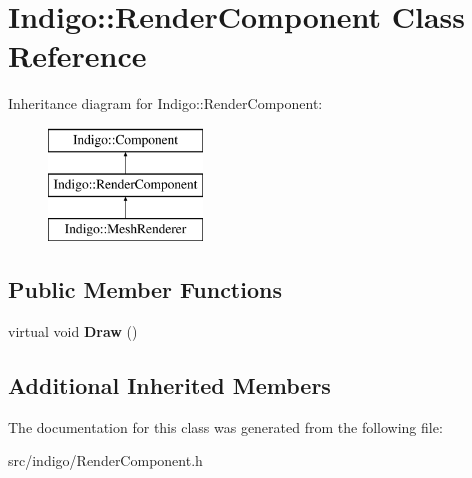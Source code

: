 \hypertarget{class_indigo_1_1_render_component}{}\section{Indigo\+:\+:Render\+Component Class Reference}
\label{class_indigo_1_1_render_component}
Inheritance diagram for Indigo\+:\+:Render\+Component\+:\begin{figure}[H]
\begin{center}
\leavevmode
\includegraphics[height=3.000000cm]{class_indigo_1_1_render_component}
\end{center}
\end{figure}
\subsection*{Public Member Functions}
\begin{DoxyCompactItemize}
\item 
\mbox{\label{class_indigo_1_1_render_component_af2e372cfda77bb739b44f1ae81a8009b}} 
virtual void {\bfseries Draw} ()
\end{DoxyCompactItemize}
\subsection*{Additional Inherited Members}


The documentation for this class was generated from the following file\+:\begin{DoxyCompactItemize}
\item 
src/indigo/Render\+Component.\+h\end{DoxyCompactItemize}
